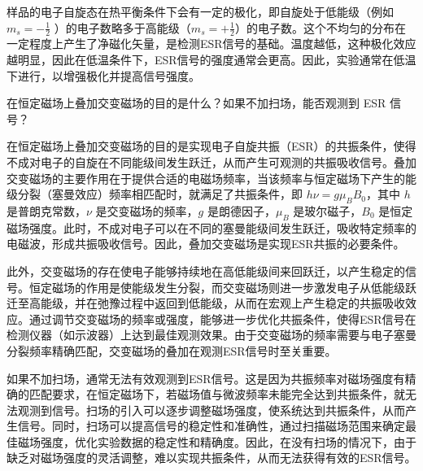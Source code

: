 样品的电子自旋态在热平衡条件下会有一定的极化，即自旋处于低能级（例如 \( m_s = -\frac{1}{2} \) ）的电子数略多于高能级（\( m_s = +\frac{1}{2} \)）的电子数。这个不均匀的分布在一定程度上产生了净磁化矢量，是检测ESR信号的基础。温度越低，这种极化效应越明显，因此在低温条件下，ESR信号的强度通常会更高。因此，实验通常在低温下进行，以增强极化并提高信号强度。

\begin{question}
	在恒定磁场上叠加交变磁场的目的是什么？如果不加扫场，能否观测到 ESR 信号？
\end{question}
在恒定磁场上叠加交变磁场的目的是实现电子自旋共振（ESR）的共振条件，使得不成对电子的自旋在不同能级间发生跃迁，从而产生可观测的共振吸收信号。叠加交变磁场的主要作用在于提供合适的电磁场频率，当该频率与恒定磁场下产生的能级分裂（塞曼效应）频率相匹配时，就满足了共振条件，即 \( h\nu = g\mu_B B_0 \)，其中 \( h \) 是普朗克常数，\( \nu \) 是交变磁场的频率，\( g \) 是朗德因子，\( \mu_B \) 是玻尔磁子，\( B_0 \) 是恒定磁场强度。此时，不成对电子可以在不同的塞曼能级间发生跃迁，吸收特定频率的电磁波，形成共振吸收信号。因此，叠加交变磁场是实现ESR共振的必要条件。

此外，交变磁场的存在使电子能够持续地在高低能级间来回跃迁，以产生稳定的信号。恒定磁场的作用是使能级发生分裂，而交变磁场则进一步激发电子从低能级跃迁至高能级，并在弛豫过程中返回到低能级，从而在宏观上产生稳定的共振吸收效应。通过调节交变磁场的频率或强度，能够进一步优化共振条件，使得ESR信号在检测仪器（如示波器）上达到最佳观测效果。由于交变磁场的频率需要与电子塞曼分裂频率精确匹配，交变磁场的叠加在观测ESR信号时至关重要。

如果不加扫场，通常无法有效观测到ESR信号。这是因为共振频率对磁场强度有精确的匹配要求，在恒定磁场下，若磁场值与微波频率未能完全达到共振条件，就无法观测到信号。扫场的引入可以逐步调整磁场强度，使系统达到共振条件，从而产生信号。同时，扫场可以提高信号的稳定性和准确性，通过扫描磁场范围来确定最佳磁场强度，优化实验数据的稳定性和精确度。因此，在没有扫场的情况下，由于缺乏对磁场强度的灵活调整，难以实现共振条件，从而无法获得有效的ESR信号。